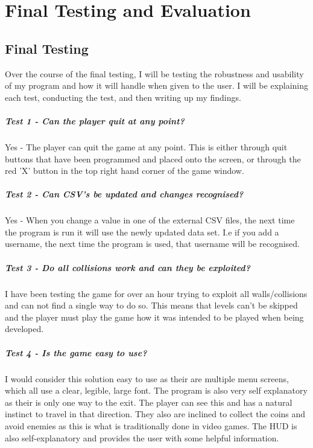 \documentclass[12pt]{report}
\begin{document}
\chapter{Final Testing and Evaluation}

\section{Final Testing}
Over the course of the final testing, I will be testing the robustness and usability of my program and how it will handle when given to the user. I will be explaining each test, conducting the test, and then writing up my findings. 

\paragraph{Test 1 - Can the player quit at any point?}
Yes - The player can quit the game at any point. This is either through quit buttons that have been programmed and placed onto the screen, or through the red 'X' button in the top right hand corner of the game window. 

\paragraph{Test 2 - Can CSV's be updated and changes recognised?}
Yes - When you change a value in one of the external CSV files, the next time the program is run it will use the newly updated data set. I.e if you add a username, the next time the program is used, that username will be recognised.

\paragraph{Test 3 - Do all collisions work and can they be exploited?}
I have been testing the game for over an hour trying to exploit all walls/collisions and can not find a single way to do so. This means that levels can't be skipped and the player must play the game how it was intended to be played when being developed. 

\paragraph{Test 4 - Is the game easy to use?}
I would consider this solution easy to use as their are multiple menu screens, which all use a clear, legible, large font. The program is also very self explanatory as their is only one way to the exit. The player can see this and has a natural instinct to travel in that direction. They also are inclined to collect the coins and avoid enemies as this is what is traditionally done in video games. The HUD is also self-explanatory and provides the user with some helpful information.
\end{document}
